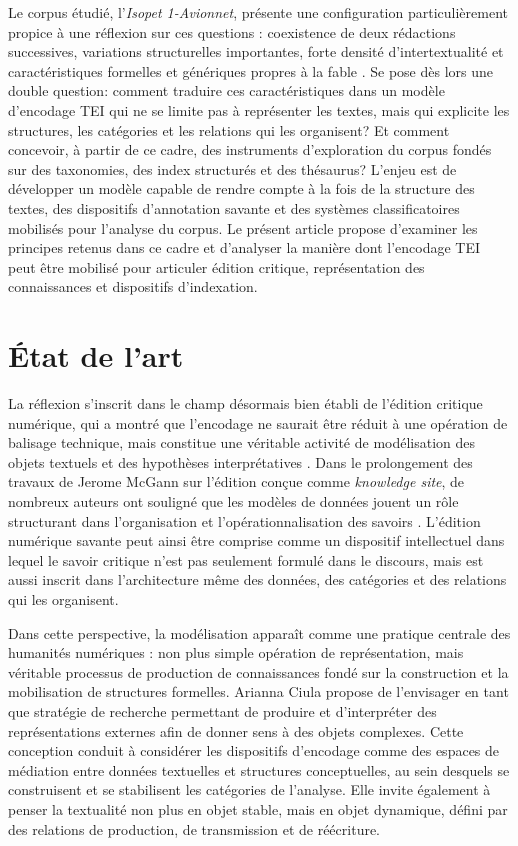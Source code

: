 \documentclass[final,fra]{anthology-ch}         %
\begin{document}
Le corpus étudié, l'\emph{Isopet 1-Avionnet}, présente une configuration
particulièrement propice à une réflexion sur ces questions : coexistence
de deux rédactions successives, variations structurelles importantes,
forte densité d'intertextualité et caractéristiques formelles et
génériques propres à la fable \cite{boivin2006naissance, casenave2023fables}.
Se pose dès
lors une double question: comment traduire ces caractéristiques dans un
modèle d'encodage TEI qui ne se limite pas à représenter les textes,
mais qui explicite les structures, les catégories et les relations qui
les organisent?
Et comment concevoir, à partir de ce cadre, des
instruments d'exploration du corpus fondés sur des taxonomies, des index
structurés et des thésaurus? L'enjeu est de développer un modèle capable
de rendre compte à la fois de la structure des textes, des dispositifs
d'annotation savante et des systèmes classificatoires mobilisés pour
l'analyse du corpus.
Le présent article propose d'examiner les principes
retenus dans ce cadre et d'analyser la manière dont l'encodage TEI peut
être mobilisé pour articuler édition critique, représentation des
connaissances et dispositifs d'indexation.
\section{État de l'art}\label{uxe9tat-de-lart}

La réflexion s'inscrit dans le champ désormais bien établi de l'édition
critique numérique, qui a montré que l'encodage ne saurait être réduit à
une opération de balisage technique, mais constitue une véritable
activité de modélisation des objets textuels et des hypothèses
interprétatives \cite{apollon2014digital, pierazzo2015digital, driscoll2016digital, sahle2016what, bleier2018digital,  casenave2023edition}.
Dans
le prolongement des travaux de Jerome McGann sur l'édition conçue comme
\emph{knowledge site}, de nombreux auteurs ont souligné que les modèles
de données jouent un rôle structurant dans l'organisation et
l'opérationnalisation des savoirs \cite{pierazzo2019what}.
L'édition numérique
savante peut ainsi être comprise comme un dispositif intellectuel dans
lequel le savoir critique n'est pas seulement formulé dans le discours,
mais est aussi inscrit dans l'architecture même des données, des catégories et des
relations qui les organisent.

Dans cette perspective, la modélisation apparaît comme une pratique
centrale des humanités numériques : non plus simple opération de
représentation, mais véritable processus de production de connaissances
fondé sur la construction et la mobilisation de structures formelles.
Arianna Ciula \cite{ciula2017digital, ciula2023modelling} propose de l'envisager
en tant que stratégie de recherche permettant de produire et
d'interpréter des représentations externes afin de
donner sens à des objets complexes.
Cette conception conduit à
considérer les dispositifs d'encodage comme des espaces
de médiation entre données textuelles et structures conceptuelles, au
sein desquels se construisent et se stabilisent les catégories de
l'analyse.
Elle invite également à penser la textualité
non plus en objet stable, mais en objet dynamique, défini par des
relations de production, de transmission et de réécriture.
\end{document}
